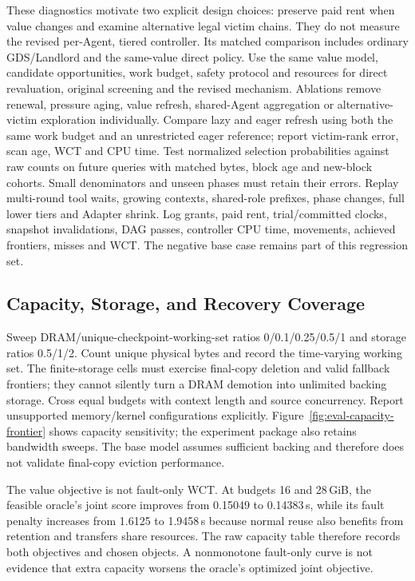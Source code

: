 \documentclass[sigplan,10pt,anonymous,nonacm]{acmart}
\begin{document}
These diagnostics motivate two explicit design choices: preserve paid
rent when value changes and examine alternative legal victim chains.
They do not measure the revised per-Agent, tiered controller. Its matched
comparison includes ordinary GDS/Landlord and the same-value direct policy.
Use the same value model, candidate opportunities,
work budget, safety protocol and resources for direct revaluation,
original screening and the revised mechanism. Ablations remove renewal,
pressure aging, value refresh, shared-Agent aggregation or alternative-victim
exploration individually. Compare lazy and eager refresh using both the same
work budget and an unrestricted eager reference; report victim-rank error,
scan age, WCT and CPU time. Test normalized selection probabilities against
raw counts on future queries with matched bytes, block age and new-block
cohorts. Small denominators and unseen phases must retain their errors. Replay multi-round tool waits, growing contexts, shared-role
prefixes, phase changes, full lower tiers and Adapter shrink. Log grants,
paid rent, trial/committed clocks, snapshot invalidations, DAG passes,
controller CPU time, movements, achieved frontiers, misses and WCT. The
negative base case remains part of this regression set.

\FloatBarrier
\subsection{Capacity, Storage, and Recovery Coverage}

Sweep DRAM/unique-checkpoint-working-set ratios 0/0.1/0.25/0.5/1 and
storage ratios 0.5/1/2. Count unique physical bytes and record the
time-varying working set. The finite-storage cells must exercise final-copy
deletion and valid fallback frontiers; they cannot silently turn a DRAM
demotion into unlimited backing storage. Cross equal budgets with
context length and source concurrency. Report unsupported memory/kernel
configurations explicitly. Figure~\ref{fig:eval-capacity-frontier} shows capacity sensitivity; the experiment package also retains bandwidth sweeps. The base model assumes sufficient backing and therefore does not validate final-copy eviction performance.

The value objective is not fault-only WCT. At budgets 16 and 28\,GiB,
the feasible oracle's joint score improves from 0.15049 to 0.14383\,s,
while its fault penalty increases from 1.6125 to 1.9458\,s because
normal reuse also benefits from retention and transfers share resources.
The raw capacity table therefore records both objectives and chosen
objects. A nonmonotone fault-only curve is not evidence that extra
capacity worsens the oracle's optimized joint objective.
\end{document}
